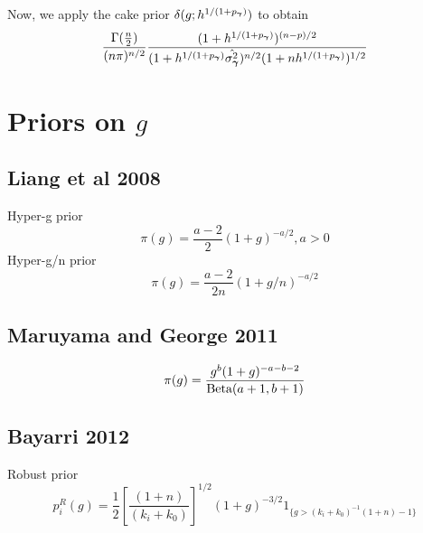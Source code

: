 \documentclass{amsart}[12pt]
\theoremstyle{definition}
\begin{document}
Now, we apply the cake prior $\delta(g; h^{1/(1 + p_{\boldsymbol \gamma})})$ to obtain
\[
	\frac{\Gamma(\frac{n}{2})}{(n \pi)^{n/2}} \frac{(1 + h^{1/(1 + p_{\boldsymbol \gamma})})^{(n-p)/2}}{(1 + h^{1/(1 + p_{\boldsymbol \gamma})} \hat{\sigma^2_{\boldsymbol \gamma}})^{n/2} (1 + nh^{1/(1 + p_{\boldsymbol \gamma})})^{1/2}}
\]

\section{Priors on $g$}

\subsection{Liang et al 2008}
\citep{Liang2008}
Hyper-g prior
$$\pi(g) = \frac{a - 2}{2} (1 + g)^{-a/2}, a > 0$$
Hyper-g/n prior
$$\pi(g) = \frac{a - 2}{2n} (1 + g/n)^{-a/2}$$
\subsection{Maruyama and George 2011}
\citep{Maruyama2011}
$$\pi(g) = \frac{g^b (1 + g)^{-a-b-2}}{\text{Beta}(a + 1, b + 1)}$$
\subsection{Bayarri 2012}
\citep{Bayarri2012}
Robust prior
$$p_i^R(g) = \frac{1}{2} \left[ \frac{(1 + n)}{(k_i + k_0)} \right]^{1/2} (1 + g)^{-3/2} 1_{\{ g > (k_i + k_0)^{-1} (1 + n) - 1 \}}$$


\end{document}
